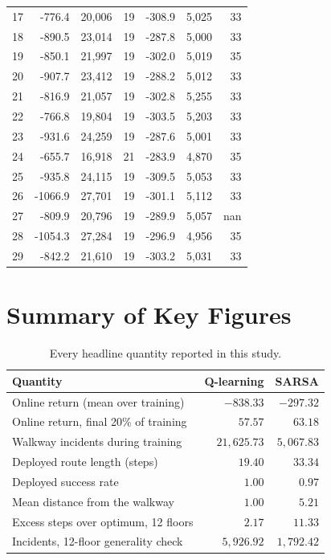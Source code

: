 \begin{longtable}{rrrrrrr}
17 &    -776.4 &  20{,}006 &    19 &    -308.9 &   5{,}025 &    33 \\
18 &    -890.5 &  23{,}014 &    19 &    -287.8 &   5{,}000 &    33 \\
19 &    -850.1 &  21{,}997 &    19 &    -302.0 &   5{,}019 &    35 \\
20 &    -907.7 &  23{,}412 &    19 &    -288.2 &   5{,}012 &    33 \\
21 &    -816.9 &  21{,}057 &    19 &    -302.8 &   5{,}255 &    33 \\
22 &    -766.8 &  19{,}804 &    19 &    -303.5 &   5{,}203 &    33 \\
23 &    -931.6 &  24{,}259 &    19 &    -287.6 &   5{,}001 &    33 \\
24 &    -655.7 &  16{,}918 &    21 &    -283.9 &   4{,}870 &    35 \\
25 &    -935.8 &  24{,}115 &    19 &    -309.5 &   5{,}053 &    33 \\
26 &   -1066.9 &  27{,}701 &    19 &    -301.1 &   5{,}112 &    33 \\
27 &    -809.9 &  20{,}796 &    19 &    -289.9 &   5{,}057 &   nan \\
28 &   -1054.3 &  27{,}284 &    19 &    -296.9 &   4{,}956 &    35 \\
29 &    -842.2 &  21{,}610 &    19 &    -303.2 &   5{,}031 &    33 \\
\bottomrule
\end{longtable}

\chapter{Summary of Key Figures}
\label{app:summary}

\begin{table}[ht]
\centering
\caption{Every headline quantity reported in this study.}
\begin{tabular}{lrr}
\toprule
\textbf{Quantity} & \textbf{Q-learning} & \textbf{SARSA} \\
\midrule
Online return (mean over training) & $-838.33$ & $-297.32$ \\
Online return, final 20\% of training & $57.57$ & $63.18$ \\
Walkway incidents during training & $21{,}625.73$ & $5{,}067.83$ \\
Deployed route length (steps) & $19.40$ & $33.34$ \\
Deployed success rate & $1.00$ & $0.97$ \\
Mean distance from the walkway & $1.00$ & $5.21$ \\
Excess steps over optimum, 12 floors & $2.17$ & $11.33$ \\
Incidents, 12-floor generality check & $5{,}926.92$ & $1{,}792.42$ \\
\bottomrule
\end{tabular}
\end{table}

